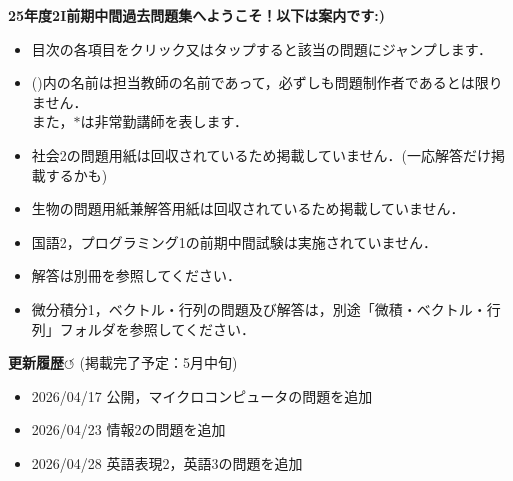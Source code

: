 \documentclass[a4paper,11pt,dvipdfmx]{jsarticle}
\begin{document}

\tableofcontents
\bigskip
\noindent\textbf{25年度2I前期中間過去問題集へようこそ！以下は案内です:)}
\begin{itemize}
    \item 目次の各項目をクリック又はタップすると該当の問題にジャンプします．
    \item ()内の名前は担当教師の名前であって，必ずしも問題制作者であるとは限りません．\\また，$\ast$は非常勤講師を表します．
    \item 社会2の問題用紙は回収されているため掲載していません．(一応解答だけ掲載するかも)
    \item 生物の問題用紙兼解答用紙は回収されているため掲載していません．
    \item 国語2，プログラミング1の前期中間試験は実施されていません．
    \item 解答は別冊を参照してください．
    \item 微分積分1，ベクトル・行列の問題及び解答は，別途「微積・ベクトル・行列」フォルダを参照してください．
\end{itemize}

\bigskip
\noindent\textbf{更新履歴$\circlearrowleft$} {\scriptsize(掲載完了予定：5月中旬)}
\begin{itemize}
    \item 2026/04/17 公開，マイクロコンピュータの問題を追加
    \item 2026/04/23 情報2の問題を追加
    \item 2026/04/28 英語表現2，英語3の問題を追加
\end{itemize}
\newpage

\title{}
\author{}
\date{}
\maketitle


\newpage

\newpage

\newpage

\newpage

\newpage

\end{document}
